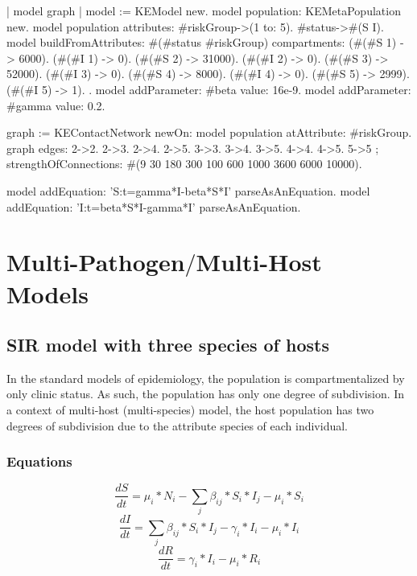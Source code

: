 \documentclass[a4paper,10pt,twoside]{book}
\begin{document}
\begin{code}{}
| model graph |
	model := KEModel new.
	model population: KEMetaPopulation new.
	model population attributes: {#riskGroup->(1 to: 5). #status->#(S I)}.
	model
		buildFromAttributes: #(#status #riskGroup)
		compartments: {
		  (#(#S 1) -> 6000). (#(#I 1) -> 0).
        (#(#S 2) -> 31000). (#(#I 2) -> 0).
        (#(#S 3) -> 52000). (#(#I 3) -> 0).
        (#(#S 4) -> 8000). (#(#I 4) -> 0).
        (#(#S 5) -> 2999). (#(#I 5) -> 1).
		}.
	model addParameter: #beta value: 16e-9.
	model addParameter: #gamma value: 0.2.

	graph := KEContactNetwork
					newOn: model population
					atAttribute: #riskGroup.
	graph edges: { 2->2. 2->3. 2->4. 2->5. 3->3. 3->4. 3->5. 4->4. 4->5. 5->5 };
			strengthOfConnections: #(9 30 180 300 100 600 1000 3600 6000 10000).

	model addEquation: 'S:t=gamma*I-beta*S*I' parseAsAnEquation.
	model addEquation: 'I:t=beta*S*I-gamma*I' parseAsAnEquation.
\end{code}

\chapter{ Multi-Pathogen$/$Multi-Host Models}\section{ SIR model with three species of hosts}
In the standard models of epidemiology, the population is compartmentalized by only clinic status.
As such, the population has only one degree of subdivision.
In a context of multi-host (multi-species) model, the host population has two degrees of subdivision due to the attribute species of each individual.
\subsection{ Equations}

  \begin{equation}
    \frac{dS}{dt} = \mu_i*N_i - \sum_j \beta_{ij}*S_i*I_j - \mu_i*S_i
  \end{equation}
  \begin{equation}
    \frac{dI}{dt} = \sum_j \beta_{ij}*S_i*I_j - \gamma_i*I_i - \mu_i*I_i
  \end{equation}
  \begin{equation}
    \frac{dR}{dt} = \gamma_i*I_i - \mu_i*R_i
  \end{equation}
  
\end{document}
